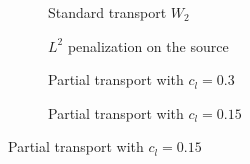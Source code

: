 \begin{figure}[hbt]
 \centering
%
\begin{subfigure}{0.5\linewidth} 
\centering
\caption{Standard transport $W_2$}
\label{subW2}
\end{subfigure}%
%
\begin{subfigure}{0.5\linewidth} 
\centering
\caption{$L^2$ penalization on the source}
\label{subL2}
\end{subfigure}%

\begin{subfigure}{0.5\linewidth} 
\centering
\caption{Partial transport with $c_l=0.3$}
\label{subPT1}
\end{subfigure}%
%
\begin{subfigure}{0.5\linewidth} 
\centering
\caption{Partial transport with $c_l = 0.15$}
\label{subPT2}
\end{subfigure}


\end{figure}
